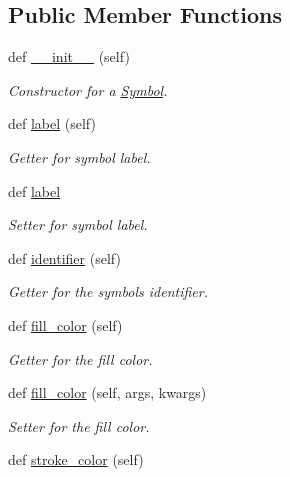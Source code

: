 \subsection*{Public Member Functions}
\begin{DoxyCompactItemize}
\item 
def \hyperlink{classbridges_1_1symbol_1_1_symbol_a57c7fcd41baccb9c2e15c9c828d957f6}{\+\_\+\+\_\+init\+\_\+\+\_\+} (self)
\begin{DoxyCompactList}\small\item\em Constructor for a \hyperlink{classbridges_1_1symbol_1_1_symbol}{Symbol}. \end{DoxyCompactList}\item 
def \hyperlink{classbridges_1_1symbol_1_1_symbol_a6e29aa07da4ce5b13130ada2688685fc}{label} (self)
\begin{DoxyCompactList}\small\item\em Getter for symbol label. \end{DoxyCompactList}\item 
def \hyperlink{classbridges_1_1symbol_1_1_symbol_a44d41804267e94598d0a29ca1a29c3b1}{label}
\begin{DoxyCompactList}\small\item\em Setter for symbol label. \end{DoxyCompactList}\item 
def \hyperlink{classbridges_1_1symbol_1_1_symbol_ab6701b43acd3e24077b1bc385b35fdf1}{identifier} (self)
\begin{DoxyCompactList}\small\item\em Getter for the symbols identifier. \end{DoxyCompactList}\item 
def \hyperlink{classbridges_1_1symbol_1_1_symbol_a1a5e9147e426fb7ec74fe60a5cdc9ded}{fill\+\_\+color} (self)
\begin{DoxyCompactList}\small\item\em Getter for the fill color. \end{DoxyCompactList}\item 
def \hyperlink{classbridges_1_1symbol_1_1_symbol_acec37468f0018db1416622062983eb46}{fill\+\_\+color} (self, args, kwargs)
\begin{DoxyCompactList}\small\item\em Setter for the fill color. \end{DoxyCompactList}\item 
def \hyperlink{classbridges_1_1symbol_1_1_symbol_ab7aef566eaf9624f6adc0ae1d5768b5b}{stroke\+\_\+color} (self)

\end{DoxyCompactItemize}
